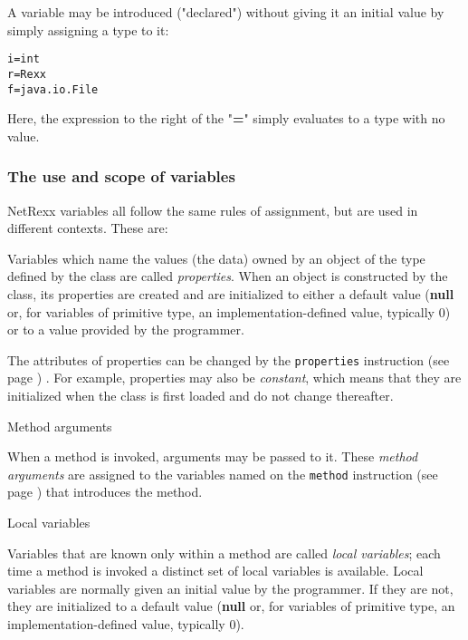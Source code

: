 A variable may be introduced ("declared") without giving it an
initial value by simply assigning a type to it:
\begin{alltt}
i=int
r=Rexx
f=java.io.File
\end{alltt}
Here, the expression to the right of the "\textbf{=}" simply
evaluates to a type with no value.
\subsubsection{The use and scope of variables}
 
NetRexx variables all follow the same rules of assignment, but are used
in different contexts.  These are:
\begin{description}
\item[Properties]\label{refprops}

Variables which name the values (the data) owned by an object of the
type defined by the class are called \emph{properties}.
When an object is constructed by the class, its properties are created
and are initialized to either a default value
(\textbf{null} or, for variables of primitive type, an
implementation-defined value, typically 0)
or to a value provided by the programmer.
 
The attributes of properties can be changed by the
 \texttt{properties} instruction (see page \pageref{refprop}) .
For example, properties may also be \emph{constant}, which means
that they are initialized when the class is first loaded and do not
change thereafter.
\item{Method arguments}

When a method is invoked, arguments may be passed to it.
These \emph{method arguments} are assigned to the variables named on
the  \texttt{method} instruction (see page \pageref{refmethod})  that introduces the
method.
\item{Local variables}

Variables that are known only within a method are called \emph{local
variables}; each time a method is invoked a distinct set of local
variables is available.
Local variables are normally given an initial value by the programmer.
If they are not, they are initialized to a default value
(\textbf{null} or, for variables of primitive type, an
implementation-defined value, typically 0).
\end{description}
 
